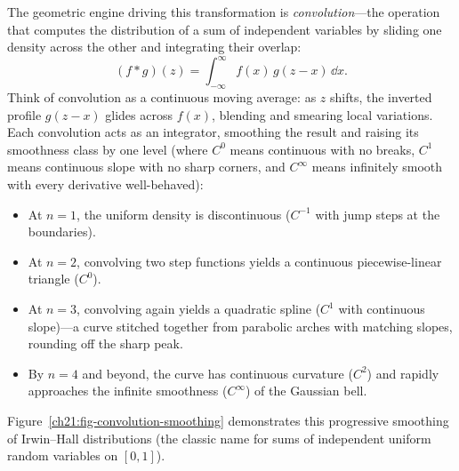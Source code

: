 The geometric engine driving this transformation is \emph{convolution}---the
operation that computes the distribution of a sum of independent variables by sliding
one density across the other and integrating their overlap:
\[
  (f * g)(z) = \int_{-\infty}^{\infty} f(x)\, g(z - x)\,\dd x.
\]
Think of convolution as a continuous moving average: as $z$ shifts, the inverted profile
$g(z-x)$ glides across $f(x)$, blending and smearing local variations. Each convolution
acts as an integrator, smoothing the result and raising its smoothness class by one level
(where $C^0$ means continuous with no breaks, $C^1$ means continuous slope with no sharp
corners, and $C^\infty$ means infinitely smooth with every derivative well-behaved):
\begin{itemize}
  \item At $n=1$, the uniform density is discontinuous ($C^{-1}$ with jump steps at the boundaries).
  \item At $n=2$, convolving two step functions yields a continuous piecewise-linear triangle ($C^0$).
  \item At $n=3$, convolving again yields a quadratic spline ($C^1$ with continuous slope)---a curve stitched together from parabolic arches with matching slopes, rounding off the sharp peak.
  \item By $n=4$ and beyond, the curve has continuous curvature ($C^2$) and rapidly approaches the infinite smoothness ($C^\infty$) of the Gaussian bell.
\end{itemize}
Figure~\ref{ch21:fig-convolution-smoothing} demonstrates this progressive smoothing of Irwin--Hall distributions (the classic name for sums of independent uniform random variables on $[0,1]$).

